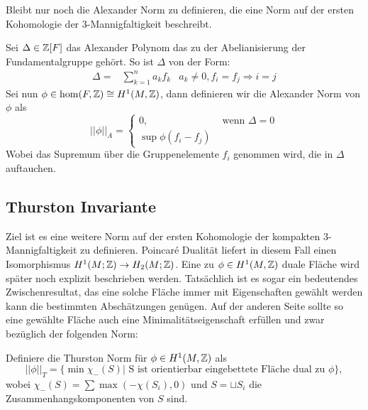     	Bleibt nur noch die Alexander Norm zu definieren, die eine Norm auf der ersten Kohomologie der 3-Mannigfaltigkeit beschreibt.
    	\begin{defn}
    		Sei  $\Delta \in \mathbb{Z} [F]$ das Alexander Polynom das zu der Abelianisierung der Fundamentalgruppe gehört. So ist $\Delta$ von der Form:
    		\begin{align*}
    		    			\Delta = &\sum_{k=1}^n a_k f_k& a_k \neq 0, f_i = f_j \Rightarrow i=j
    		\end{align*}
    		Sei nun $\phi \in \hom (F,\mathbb{Z}) \cong H^1 (M,\mathbb{Z})$, dann definieren wir die Alexander Norm von $\phi$ als
    		\[
    			||\phi||_A = \begin{cases}
    				0 , &\text{ wenn } \Delta=0\\
    				\sup \phi (f_i - f_j) &
    			\end{cases}
    		\]
    		Wobei das Supremum über die Gruppenelemente $f_i$ genommen wird, die in $\Delta$ auftauchen.

    	\end{defn}

    \subsection{Thurston Invariante}
        Ziel ist es eine weitere Norm auf der ersten Kohomologie der kompakten 3-Mannigfaltigkeit zu definieren. Poincaré Dualität liefert in diesem Fall einen Isomorphismus $H^1(M;\mathbb{Z}) \to H_2(M;\mathbb{Z})$. Eine zu $\phi \in H^1(M,\mathbb{Z})$ duale Fläche wird später noch explizit beschrieben werden. Tatsächlich ist es sogar ein bedeutendes Zwischenresultat, das eine solche Fläche immer mit Eigenschaften gewählt werden kann die bestimmten Abschätzungen genügen. Auf der anderen Seite sollte so eine gewählte Fläche auch eine Minimalitätseigenschaft erfüllen und zwar bezüglich der folgenden Norm:
        \begin{defn}
        	Definiere die Thurston Norm für $\phi \in H^1(M,\mathbb{Z})$ als
        	\[
        	        		||\phi||_T = \{\min \chi_-(S)| \text{ S ist orientierbar eingebettete Fläche dual zu } \phi \},
        	        	\]        	
        	wobei $\chi_-(S)=\sum \max (-\chi(S_i),0)$  und $S=\sqcup S_i$ die Zusammenhangskomponenten von $S$ sind.
        \end{defn}


